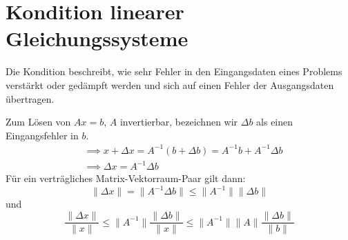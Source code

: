 \section{Kondition linearer Gleichungssysteme}
\begin{recall}
Die Kondition beschreibt, wie sehr Fehler in den Eingangsdaten eines Problems
verstärkt oder gedämpft werden und sich auf einen Fehler der Ausgangsdaten übertragen.
\end{recall}
Zum Lösen von $Ax=b$, $A$ invertierbar, bezeichnen wir $\Delta b$ als einen Eingangsfehler in $b$. 
\begin{align*}
&\implies x+ \Delta x = A^{-1}(b+\Delta b) = A^{-1}b +A^{-1} \Delta b \\
&\implies \Delta x= A^{-1} \Delta b
\end{align*}
Für ein verträgliches Matrix-Vektorraum-Paar gilt dann: 
\[
\|\Delta x\|= \|A^{-1} \Delta b\| \le \|A^{-1}\|\|\Delta b\| 
\]
und 
\[
	\frac{\|\Delta x\|}{\|x\|} \le \|A^{-1}\| \frac{\|\Delta b\|}{\|x\|}\le  \|A^{-1}\| \|A\| \frac{\|\Delta b\|}{\|b\|}
\]
